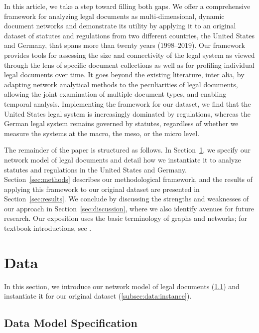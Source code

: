 \documentclass[utf8,sort&compress,table,hidelinks]{frontiersFPHY} %
\begin{document}
In this article, we take a step toward filling both gaps.
We offer a comprehensive framework for analyzing legal documents as multi-dimensional, dynamic document networks 
and demonstrate its utility by applying it to an original dataset of statutes and regulations from two different countries, the United States and Germany, that spans more than twenty years ($1998$--$2019$).
Our framework provides tools for assessing the size and connectivity of the legal system as viewed through the lens of specific document collections as well as for profiling individual legal documents over time. 
It goes beyond the existing literature, inter alia, by adapting network analytical methods to the peculiarities of legal documents, allowing the joint examination of multiple document types, and enabling temporal analysis.
Implementing the framework for our dataset, we find that the United States legal system is increasingly dominated by regulations, 
whereas the German legal system remains governed by statutes, 
regardless of whether we measure the systems at the macro, the meso, or the micro level.

The remainder of the paper is structured as follows.
In Section~\ref{sec:data}, we specify our network model of legal documents and detail how we instantiate it to analyze statutes and regulations in the United States and Germany.
Section~\ref{sec:methods} describes our methodological framework,
and the results of applying this framework to our original dataset are presented in Section~\ref{sec:results}.
We conclude by discussing the strengths and weaknesses of our approach in Section~\ref{sec:discussion}, where we also identify avenues for future research. 
Our exposition uses the basic terminology of graphs and networks; for textbook introductions, see \cite{easley2010,barabasi2016,newman2018}.


\section{Data}
\label{sec:data}

In this section, we introduce our network model of legal documents (\ref{subsec:data:model}) and instantiate it for our original dataset (\ref{subsec:data:instance}).

\vspace*{6pt}
\subsection{Data Model Specification}\label{subsec:data:model}
\end{document}
